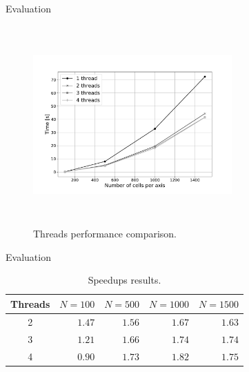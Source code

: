 \documentclass{beamer}
\begin{document}
      \begin{frame}{Evaluation}
        \begin{figure}[!ht]
          \centering
          \includegraphics[width=3in,height=3in,clip,keepaspectratio]{figures/benchmark.pdf}
          \caption{Threads performance comparison.}
          \label{fig:benchmark}
        \end{figure}
      \end{frame}
      
      \begin{frame}{Evaluation}
        \begin{table}[!ht]
        \renewcommand{\arraystretch}{1.3}
        \centering
        \caption{Speedups results.}
        \label{tab:speedups}
        \begin{tabular}{c||rrrr}
          \hline
          Threads & $N=100$ & $N=500$ & $N=1000$ & $N=1500$ \\ \hline\hline
          2       & $1.47$ & $1.56$ & $1.67$ & $1.63$ \\
          3       & $1.21$ & $1.66$ & $1.74$ & $1.74$ \\
          4       & $0.90$ & $1.73$ & $1.82$ & $1.75$  
          \end{tabular}
        \end{table}
      \end{frame}
      
\end{document}
